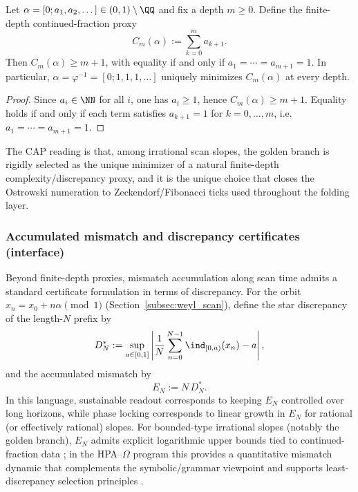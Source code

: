 \begin{proposition}\label{prop:golden_least_discrepancy}
Let $\alpha=[0;a_1,a_2,\dots]\in(0,1)\setminus\QQ$ and fix a depth $m\ge 0$.
Define the finite-depth continued-fraction proxy
\[
C_m(\alpha):=\sum_{k=0}^{m} a_{k+1}.
\]
Then $C_m(\alpha)\ge m+1$, with equality if and only if $a_1=\cdots=a_{m+1}=1$.
In particular, $\alpha=\varphi^{-1}=[0;1,1,1,\dots]$ uniquely minimizes $C_m(\alpha)$ at every depth.
\end{proposition}
\begin{proof}
Since $a_i\in\NN$ for all $i$, one has $a_i\ge 1$, hence $C_m(\alpha)\ge m+1$.
Equality holds if and only if each term satisfies $a_{k+1}=1$ for $k=0,\dots,m$, i.e.\ $a_1=\cdots=a_{m+1}=1$.
\end{proof}
The CAP reading is that, among irrational scan slopes, the golden branch is rigidly selected as the unique minimizer of a natural finite-depth complexity/discrepancy proxy, and it is the unique choice that closes the Ostrowski numeration to Zeckendorf/Fibonacci ticks used throughout the folding layer.

\subsubsection{Accumulated mismatch and discrepancy certificates (interface)}
\label{subsubsec:discrepancy_certificates}

Beyond finite-depth proxies, mismatch accumulation along scan time admits a standard certificate formulation in terms of discrepancy.
For the orbit $x_n=x_0+n\alpha\pmod 1$ (Section~\ref{subsec:weyl_scan}), define the star discrepancy of the length-$N$ prefix by \cite{KuipersNiederreiter1974}
\begin{equation}
\label{eq:star_discrepancy_def}
D_N^\ast
:=
\sup_{a\in[0,1]}
\left|
\frac{1}{N}\sum_{n=0}^{N-1}\ind_{[0,a)}(x_n) - a
\right|,
\end{equation}
and the accumulated mismatch by
\begin{equation}
\label{eq:accumulated_mismatch_def}
E_N := N\,D_N^\ast.
\end{equation}
In this language, sustainable readout corresponds to keeping $E_N$ controlled over long horizons, while phase locking corresponds to linear growth in $E_N$ for rational (or effectively rational) slopes.
For bounded-type irrational slopes (notably the golden branch), $E_N$ admits explicit logarithmic upper bounds tied to continued-fraction data \cite{Cassels1957,KuipersNiederreiter1974}; in the HPA--$\Omega$ program this provides a quantitative mismatch dynamic that complements the symbolic/grammar viewpoint and supports least-discrepancy selection principles \cite{Ma2025HPT,Ma2025CAP}.

